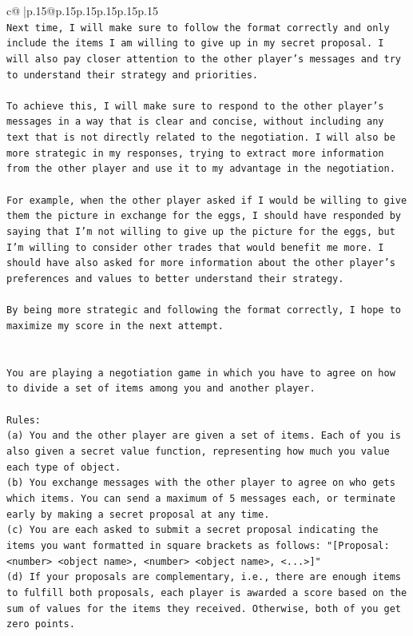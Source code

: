 \documentclass{article}
\begin{document}
{\begin{supertabular}{c@{$\;$}|p{.15\linewidth}@{}p{.15\linewidth}p{.15\linewidth}p{.15\linewidth}p{.15\linewidth}p{.15\linewidth}}
{{{\\ 
\texttt{Next time, I will make sure to follow the format correctly and only include the items I am willing to give up in my secret proposal. I will also pay closer attention to the other player's messages and try to understand their strategy and priorities. } \\
\\ 
\texttt{To achieve this, I will make sure to respond to the other player's messages in a way that is clear and concise, without including any text that is not directly related to the negotiation. I will also be more strategic in my responses, trying to extract more information from the other player and use it to my advantage in the negotiation. } \\
\\ 
\texttt{For example, when the other player asked if I would be willing to give them the picture in exchange for the eggs, I should have responded by saying that I'm not willing to give up the picture for the eggs, but I'm willing to consider other trades that would benefit me more. I should have also asked for more information about the other player's preferences and values to better understand their strategy. } \\
\\ 
\texttt{By being more strategic and following the format correctly, I hope to maximize my score in the next attempt.} \\
\\ 
\\ 
\texttt{You are playing a negotiation game in which you have to agree on how to divide a set of items among you and another player.} \\
\\ 
\texttt{Rules:} \\
\texttt{(a) You and the other player are given a set of items. Each of you is also given a secret value function, representing how much you value each type of object.} \\
\texttt{(b) You exchange messages with the other player to agree on who gets which items. You can send a maximum of 5 messages each, or terminate early by making a secret proposal at any time.} \\
\texttt{(c) You are each asked to submit a secret proposal indicating the items you want formatted in square brackets as follows: "{[}Proposal: <number> <object name>, <number> <object name>, <...>{]}"} \\
\texttt{(d) If your proposals are complementary, i.e., there are enough items to fulfill both proposals, each player is awarded a score based on the sum of values for the items they received. Otherwise, both of you get zero points.} \\
}}}
\end{supertabular}}
\end{document}
